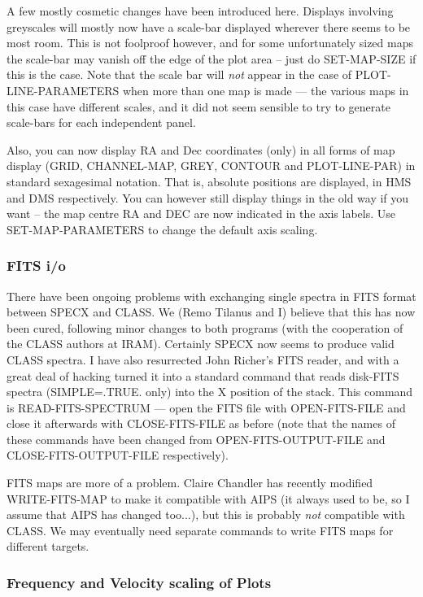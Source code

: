 \documentclass[twoside,11pt]{article}
\renewcommand{\_}{\texttt{\symbol{95}}}
\begin{document}
A few mostly cosmetic changes have been introduced here. Displays involving
greyscales will mostly now have a scale-bar displayed wherever there seems
to be most room. This is not foolproof however, and for some unfortunately
sized maps the scale-bar may vanish off the edge of the plot area -- just
do SET-MAP-SIZE if this is the case. Note that the scale bar will \emph{not}
appear in the case of PLOT-LINE-PARAMETERS when more than one map is made ---
the various maps in this case have different scales, and it did not seem
sensible to try to generate scale-bars for each independent panel.

Also, you can now display RA and Dec coordinates (only) in all forms of
map display (GRID, CHANNEL-MAP, GREY, CONTOUR and PLOT-LINE-PAR) in
standard sexagesimal notation. That is, absolute positions are displayed,
in HMS and DMS respectively. You can however still display things in the
old way if you want -- the map centre RA and DEC are now indicated in the
axis labels. Use SET-MAP-PARAMETERS to change the default axis scaling.


\subsubsection{FITS i/o}

There have been ongoing problems with exchanging single spectra in FITS
format between SPECX and CLASS. We (Remo Tilanus and I) believe that
this has now been cured, following minor changes to both programs (with
the cooperation of the CLASS authors at IRAM). Certainly SPECX now
seems to produce valid CLASS spectra. I have also resurrected John
Richer's FITS reader, and with a great deal of hacking turned it into a
standard command that reads disk-FITS spectra (SIMPLE=.TRUE. only) into
the X position of the stack. This command is READ-FITS-SPECTRUM   ---
open the FITS file with OPEN-FITS-FILE and close it afterwards with
CLOSE-FITS-FILE as before (note that the names of these commands have
been changed from OPEN-FITS-OUTPUT-FILE and CLOSE-FITS-OUTPUT-FILE
respectively).

FITS maps are more of a problem. Claire Chandler has recently modified
WRITE-FITS-MAP to make it compatible with AIPS (it always used to be, so I
assume that AIPS has changed too...), but this is probably \emph{not}
compatible with CLASS. We may eventually need separate commands to write FITS
maps for different targets.


\subsubsection{Frequency and Velocity scaling of Plots}
\end{document}
